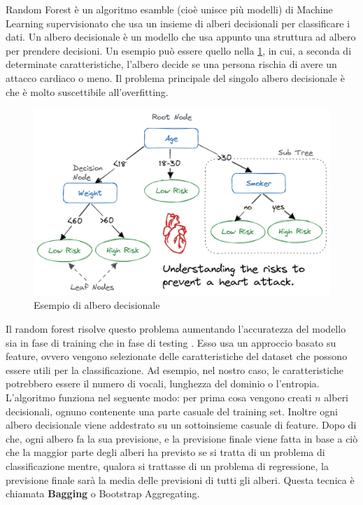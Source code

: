 \documentclass[12pt,a4paper,openright,twoside]{book}
\begin{document}
Random Forest è un algoritmo esamble (cioè unisce più modelli) di Machine Learning supervisionato
che usa un insieme di alberi decisionali
per classificare i dati. Un albero decisionale è un modello che usa appunto una struttura ad albero
per prendere decisioni. Un esempio può essere quello nella \cref{fig:decision tree}, in cui, a seconda di determinate
caratteristiche, l'albero decide se una persona rischia di avere un attacco cardiaco o meno.
Il problema principale del singolo albero decisionale è che è molto suscettibile
all'overfitting.
\begin{figure}[H]
    \centering
    \includegraphics[width=.8\linewidth]{figures/Decision_tree_for_heart_attack.png}
    \caption{Esempio di albero decisionale \cite{decision_tree_image}}
    \label{fig:decision tree}
\end{figure}

\noindent Il random forest risolve questo problema aumentando 
l'accuratezza del modello sia in fase di training che in fase di testing \cite{598994}.
Esso usa un approccio basato su feature, ovvero vengono selezionate
delle caratteristiche del dataset che possono essere utili per la classificazione.
Ad esempio, nel nostro caso, le caratteristiche potrebbero essere
il numero di vocali, lunghezza del dominio o l'entropia.
L'algoritmo funziona nel seguente modo:
per prima cosa vengono creati $n$ alberi decisionali, ognuno
contenente una parte casuale del training set. Inoltre
ogni albero decisionale viene addestrato su un sottoinsieme casuale
di feature. Dopo di che, ogni albero fa la sua previsione,
e la previsione finale viene fatta in base a ciò che la maggior parte
degli alberi ha previsto se si tratta di un problema di classificazione mentre, qualora si trattasse di un problema di regressione,
la previsione finale sarà la media delle previsioni di tutti gli alberi.
Questa tecnica è chiamata \textbf{Bagging} o Bootstrap Aggregating.
\end{document}

